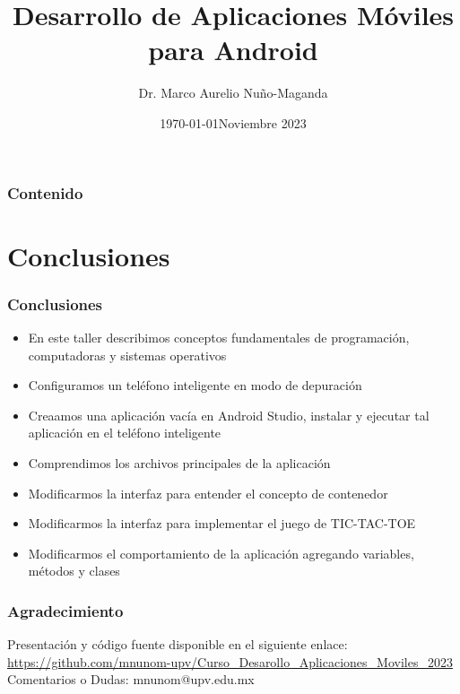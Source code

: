 \documentclass[pdf,
serif,
compress,
xcolor=table,
dvipsnames,
spanish,
aspectratio=169]{beamer}
\date{\specialdate\today}
\title{Desarrollo de Aplicaciones M\'oviles para Android}
\author[Dr. Marco Aurelio Nuño-Maganda]{Dr. Marco Aurelio Nuño-Maganda}
\institute[UPV]{Universidad Politecnica de Victoria\\\url{https://github.com/mnunom-upv/Curso_Desarollo_Aplicaciones_Moviles_2023}}
\date[]{Noviembre 2023}
\begin{document}
\begin{frame}[plain]
  \titlepage
\end{frame}

\begin{frame}
\frametitle{Contenido}  
  \tableofcontents
\end{frame}








\section{Conclusiones} 
\begin{frame}
\frametitle{Conclusiones}  
\begin{itemize}
\item En este taller describimos conceptos fundamentales de programaci\'on, computadoras y sistemas operativos
\item Configuramos un tel\'efono inteligente en modo de depuraci\'on
\item Creaamos una aplicaci\'on vac\'ia en Android Studio, instalar y ejecutar tal aplicaci\'on en el tel\'efono inteligente
\item Comprendimos los archivos principales de la aplicaci\'on
\item Modificarmos la interfaz para entender el concepto de contenedor
\item Modificarmos la interfaz para implementar el juego de TIC-TAC-TOE
\item Modificarmos el comportamiento de la aplicaci\'on agregando variables, m\'etodos y clases 
\end{itemize}
\end{frame}

\begin{frame}
\frametitle{Agradecimiento}  
Presentaci\'on y c\'odigo fuente disponible en el siguiente enlace:\\
\url{https://github.com/mnunom-upv/Curso_Desarollo_Aplicaciones_Moviles_2023}\\
Comentarios o Dudas: mnunom@upv.edu.mx
\end{frame}
\end{document}
